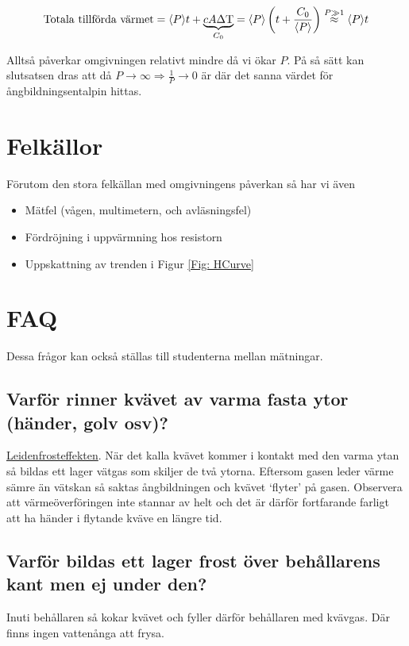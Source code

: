 \documentclass[11pt]{article}
\begin{document}
\begin{equation*}
    \text{Totala tillförda värmet} = \langle P \rangle t + \underbrace{ c A \Delta \text T }_{C_0} = \langle P \rangle \left (t + \frac{C_0}{\langle P \rangle} \right ) \stackrel{P \gg 1}{\approx} \langle P \rangle t
\end{equation*}

Alltså påverkar omgivningen relativt mindre då vi ökar $P$. På så sätt kan slutsatsen dras att då $P \to \infty \Rightarrow \frac{1}{P} \to 0$ är där det sanna värdet för ångbildningsentalpin hittas.

\section{Felkällor}

Förutom den stora felkällan med omgivningens påverkan så har vi även

\begin{itemize}
    \item Mätfel (vågen, multimetern, och avläsningsfel)
    \item Fördröjning i uppvärmning hos resistorn
    \item Uppskattning av trenden i Figur \ref{Fig: HCurve}
\end{itemize}


\section{FAQ}

Dessa frågor kan också ställas till studenterna mellan mätningar.

\subsection*{Varför rinner kvävet av varma fasta ytor (händer, golv osv)?}

\href{https://en.wikipedia.org/wiki/Leidenfrost_effect}{Leidenfrosteffekten}. När det kalla kvävet kommer i kontakt med den varma ytan så bildas ett lager vätgas som skiljer de två ytorna. Eftersom gasen leder värme sämre än vätskan så saktas ångbildningen och kvävet `flyter' på gasen. Observera att värmeöverföringen inte stannar av helt och det är därför fortfarande farligt att ha händer i flytande kväve en längre tid.

\subsection*{Varför bildas ett lager frost över behållarens kant men ej under den?}

Inuti behållaren så kokar kvävet och fyller därför behållaren med kvävgas. Där finns ingen vattenånga att frysa.
\end{document}
